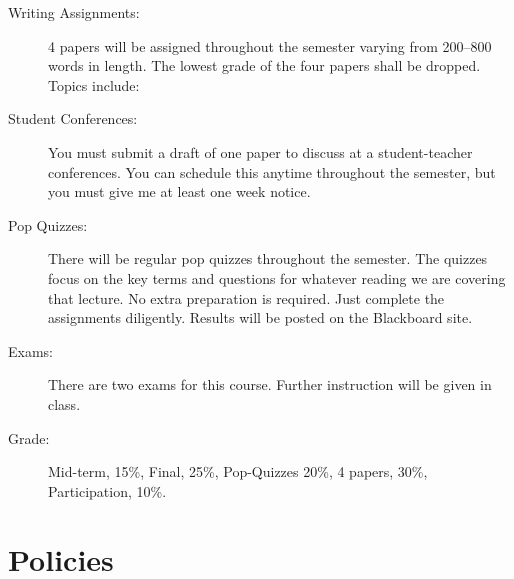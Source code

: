 \documentclass[oneside, 11pt]{article}
\begin{document}
\begin{description}
\item[Writing Assignments:] 4 papers will be assigned throughout the semester varying from 200--800 words in length. The lowest grade of the four papers shall be dropped. Topics include:

\item[Student Conferences:] You must submit a draft of one paper to discuss at a student-teacher conferences. You can schedule this anytime throughout the semester, but you must give me at least one week notice. 
\item[Pop Quizzes:] There will be regular pop quizzes throughout the semester. The quizzes focus on the key terms and questions for whatever reading  we are covering that lecture. No extra preparation is required. Just complete the assignments diligently.  Results will be posted on the Blackboard site. 
\item [Exams:] There are two exams for this course. Further instruction will be given in class.
\item[Grade:] Mid-term, 15\%, Final, 25\%, Pop-Quizzes 20\%, 4 papers, 30\%, Participation, 10\%. 
\end{description} 

\section*{Policies}
\end{document}
